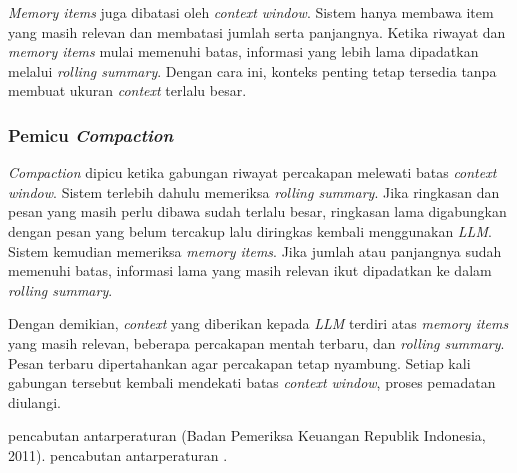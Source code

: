 \emph{Memory items} juga dibatasi oleh \emph{context window}. Sistem hanya membawa
item yang masih relevan dan membatasi jumlah serta panjangnya. Ketika riwayat dan
\emph{memory items} mulai memenuhi batas, informasi yang lebih lama dipadatkan melalui
\emph{rolling summary}. Dengan cara ini, konteks penting tetap tersedia tanpa membuat
ukuran \emph{context} terlalu besar.

\subsubsection{Pemicu \emph{Compaction}}
\label{subsubsec:trigger-compaction}

\emph{Compaction} dipicu ketika gabungan riwayat percakapan melewati batas \emph{context
window}. Sistem terlebih dahulu memeriksa \emph{rolling summary}. Jika ringkasan dan
pesan yang masih perlu dibawa sudah terlalu besar, ringkasan lama digabungkan dengan
pesan yang belum tercakup lalu diringkas kembali menggunakan \emph{LLM}. Sistem kemudian
memeriksa \emph{memory items}. Jika jumlah atau panjangnya sudah memenuhi batas,
informasi lama yang masih relevan ikut dipadatkan ke dalam \emph{rolling summary}.

Dengan demikian, \emph{context} yang diberikan kepada \emph{LLM} terdiri atas \emph{memory
items} yang masih relevan, beberapa percakapan mentah terbaru, dan \emph{rolling summary}.
Pesan terbaru dipertahankan agar percakapan tetap nyambung. Setiap kali gabungan tersebut
kembali mendekati batas \emph{context window}, proses pemadatan diulangi.



pencabutan antarperaturan (Badan Pemeriksa Keuangan Republik Indonesia, 2011).
pencabutan antarperaturan \parencite{uuPembentukanPeraturan2011}.
